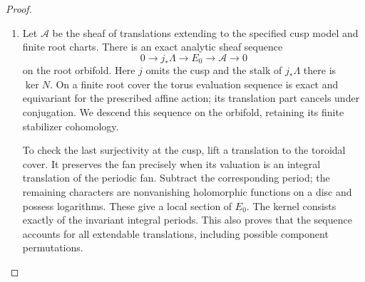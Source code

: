\begin{proof}
\begin{enumerate}[label=\arabic*.]
\item Let $\mathcal A$ be the sheaf of translations extending to
the specified cusp model and finite root charts. There is
an exact analytic sheaf sequence
\[
0\to j_*\Lambda\to E_0\to\mathcal A\to0
\]
on the root orbifold. Here $j$ omits the cusp and the stalk
of $j_*\Lambda$ there is $\ker N$.
On a finite root cover the torus evaluation sequence is exact and
equivariant for the prescribed affine action; its translation part
cancels under conjugation.  We descend this sequence on the orbifold,
retaining its finite stabilizer cohomology.

To check the last surjectivity at the cusp, lift a translation
to the toroidal cover. It preserves the fan precisely when
its valuation is an integral translation of the periodic
fan. Subtract the corresponding period; the remaining
characters are nonvanishing holomorphic functions on a
disc and possess logarithms. These give a local section
of $E_0$. The kernel consists exactly of the invariant
integral periods. This also proves that the sequence
accounts for all extendable translations, including
possible component permutations.


\end{enumerate}
\end{proof}
